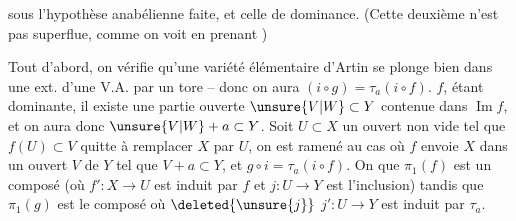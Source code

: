 sous l'hypothèse anabélienne faite, et celle de dominance. (Cette deuxième n'est pas superflue, comme on voit en prenant  )

Tout d'abord, on vérifie qu'une variété élémentaire d'Artin se plonge  bien dans une ext. d'une V.A. par un tore -- donc on aura $(i\circ g)=\tau_a(i\circ f)$.    $f$, étant dominante, il existe une partie ouverte  $\unsure{V|W}\subset Y$ contenue dans $\operatorname{Im}f$, et on aura donc $\unsure{V|W}+a\subset Y$. Soit $U\subset X$ un ouvert non vide tel que $f(U)\subset V$   quitte à remplacer $X$ par $U$, on est ramené au cas où $f$ envoie $X$ dans un ouvert $V$ de $Y$ tel que $V+a\subset Y$, et $g\circ i=\tau_a(i\circ f)$. On   que $\pi_1(f)$ est un composé (où $f':X\longrightarrow U$ est  induit par $f$ et $j:U\longrightarrow Y$ est l'inclusion)
tandis que $\pi_1(g)$ est le composé
où $\deleted{\unsure{j}}$ $j':U\longrightarrow Y$ est induit par $\tau_a$.
